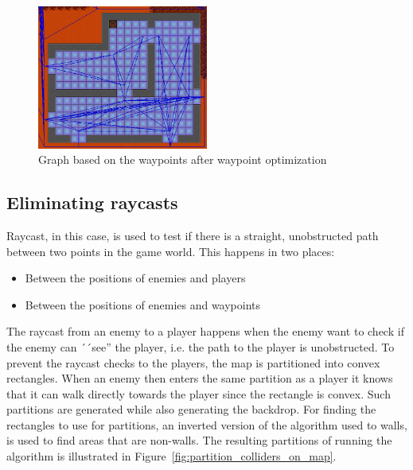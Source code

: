 \begin{figure}[H]
	\includegraphics[width=0.5\textwidth]{figures/astar/optimizedWaypointsGraph}
	\caption{Graph based on the waypoints after waypoint optimization}
	\label{waypointgraphOpt}
\end{figure}

\subsection*{Eliminating raycasts}
Raycast, in this case, is used to test if there is a straight, unobstructed path between two points in the game world.
This happens in two places:
\begin{itemize}
\item Between the positions of enemies and players
\item Between the positions of enemies and waypoints
\end{itemize}
The raycast from an enemy to a player happens when the enemy want to check if the enemy can ´´see'' the player, i.e. the path to the player is unobstructed.
To prevent the raycast checks to the players, the map is partitioned into convex rectangles.
When an enemy then enters the same partition as a player it knows that it can walk directly towards the player since the rectangle is convex.
Such partitions are generated while also generating the backdrop.
For finding the rectangles to use for partitions, an inverted version of the algorithm used to walls, is used to find areas that are non-walls.
The resulting partitions of running the algorithm is illustrated in Figure~\ref{fig:partition_colliders_on_map}.

